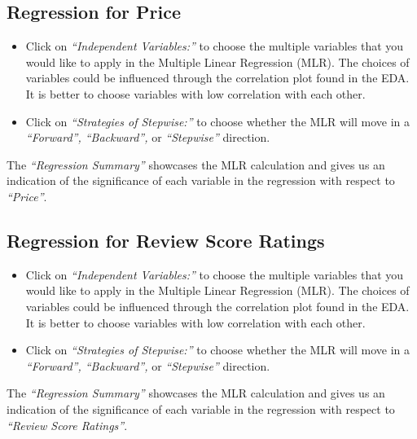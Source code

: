 \documentclass[
]{article}
\providecommand{\tightlist}{%
  \setlength{\itemsep}{0pt}\setlength{\parskip}{0pt}}
\begin{document}
\hypertarget{regression-for-price}{%
\subsection{Regression for Price}\label{regression-for-price}}

\begin{itemize}
\tightlist
\item
  Click on \emph{``Independent Variables:''} to choose the multiple
  variables that you would like to apply in the Multiple Linear
  Regression (MLR). The choices of variables could be influenced through
  the correlation plot found in the EDA. It is better to choose
  variables with low correlation with each other.
\item
  Click on \emph{``Strategies of Stepwise:''} to choose whether the MLR
  will move in a \emph{``Forward'', ``Backward'',} or
  \emph{``Stepwise''} direction.
\end{itemize}

The \emph{``Regression Summary''} showcases the MLR calculation and
gives us an indication of the significance of each variable in the
regression with respect to \emph{``Price''}.

\hypertarget{regression-for-review-score-ratings}{%
\subsection{Regression for Review Score
Ratings}\label{regression-for-review-score-ratings}}

\begin{itemize}
\tightlist
\item
  Click on \emph{``Independent Variables:''} to choose the multiple
  variables that you would like to apply in the Multiple Linear
  Regression (MLR). The choices of variables could be influenced through
  the correlation plot found in the EDA. It is better to choose
  variables with low correlation with each other.
\item
  Click on \emph{``Strategies of Stepwise:''} to choose whether the MLR
  will move in a \emph{``Forward'', ``Backward'',} or
  \emph{``Stepwise''} direction.
\end{itemize}

The \emph{``Regression Summary''} showcases the MLR calculation and
gives us an indication of the significance of each variable in the
regression with respect to \emph{``Review Score Ratings''}.
\end{document}
